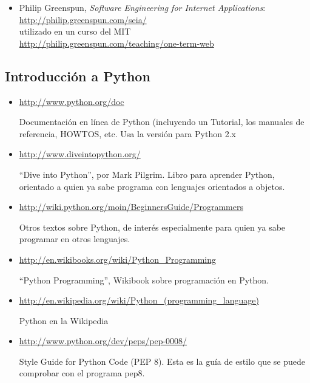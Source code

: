 {\begin{itemize}
\item Philip Greenspun, \textsl{Software Engineering for Internet Applications}:\\
  \url{http://philip.greenspun.com/seia/} \\
  utilizado en un curso del MIT \\
  \url{http://philip.greenspun.com/teaching/one-term-web}
\end{itemize}

\subsection{Introducción a Python}

\begin{itemize}
\item \url{http://www.python.org/doc}

Documentación en línea de Python (incluyendo un Tutorial, los manuales de referencia, HOWTOS, etc. Usa la versión para Python 2.x

\item \url{http://www.diveintopython.org/}

``Dive into Python'', por Mark Pilgrim. Libro para aprender Python, orientado a quien ya sabe programa con lenguajes orientados a objetos.

\item \url{http://wiki.python.org/moin/BeginnersGuide/Programmers}

Otros textos sobre Python, de interés especialmente para quien ya sabe programar en otros lenguajes.

\item \url{http://en.wikibooks.org/wiki/Python_Programming}

``Python Programming'', Wikibook sobre programación en Python.

\item \url{http://en.wikipedia.org/wiki/Python_(programming_language)}

Python en la Wikipedia

\item \url{http://www.python.org/dev/peps/pep-0008/}

Style Guide for Python Code (PEP 8). Esta es la guía de estilo que se puede comprobar con el programa pep8.
\end{itemize}

}
